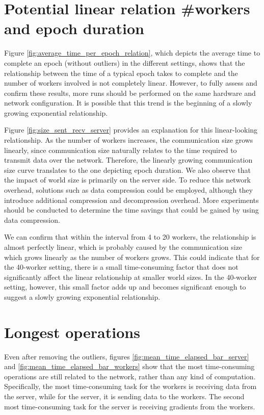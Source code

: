 
\section{Potential linear relation \#workers and epoch duration}
Figure \ref{fig:average_time_per_epoch_relation}, which depicts the average time to complete an epoch (without outliers) in the different settings, shows that the relationship between the time of a typical epoch takes to complete and the number of workers involved is not completely linear. However, to fully assess and confirm these results, more runs should be performed on the same hardware and network configuration. It is possible that this trend is the beginning of a slowly growing exponential relationship.

Figure \ref{fig:size_sent_recv_server} provides an explanation for this linear-looking relationship. As the number of workers increases, the communication size grows linearly, since communication size naturally relates to the time required to transmit data over the network. Therefore, the linearly growing communication size curve translates to the one depicting epoch duration. We also observe that the impact of world size is primarily on the server side. To reduce this network overhead, solutions such as data compression could be employed, although they introduce additional compression and decompression overhead. More experiments should be conducted to determine the time savings that could be gained by using data compression.

We can confirm that within the interval from 4 to 20 workers, the relationship is almost perfectly linear, which is probably caused by the communication size which grows linearly as the number of workers grows. This could indicate that for the 40-worker setting, there is a small time-consuming factor that does not significantly affect the linear relationship at smaller world sizes. In the 40-worker setting, however, this small factor adds up and becomes significant enough to suggest a slowly growing exponential relationship.

\section{Longest operations}
Even after removing the outliers, figures \ref{fig:mean_time_elapsed_bar_server} and \ref{fig:mean_time_elapsed_bar_workers} show that the most time-consuming operations are still related to the network, rather than any kind of computation. Specifically, the most time-consuming task for the workers is receiving data from the server, while for the server, it is sending data to the workers. The second most time-consuming task for the server is receiving gradients from the workers.

